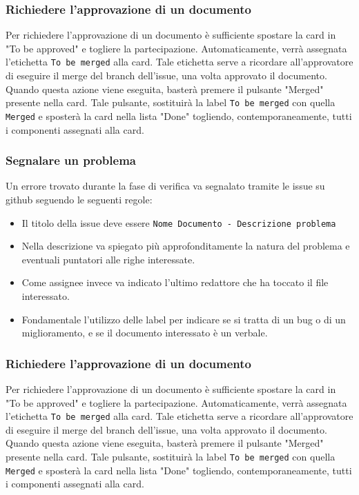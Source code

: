 \subsubsection{Richiedere l'approvazione di un documento}
Per richiedere l'approvazione di un documento è sufficiente spostare la card in "To be approved" e togliere la partecipazione. Automaticamente, verrà assegnata l'etichetta \texttt{To be merged} alla card. Tale etichetta serve a ricordare all'approvatore di eseguire il merge del branch dell'issue, una volta approvato il documento.
Quando questa azione viene eseguita, basterà premere il pulsante "Merged" presente nella card. Tale pulsante, sostituirà la label \texttt{To be merged} con quella \texttt{Merged} e sposterà la card nella lista "Done" togliendo, contemporaneamente, tutti i componenti assegnati alla card.


\subsubsection{Segnalare un problema}
Un errore trovato durante la fase di verifica va segnalato tramite le issue su github
seguendo le seguenti regole:
\begin{itemize}
    \item Il titolo della issue deve essere
    \texttt{Nome Documento - Descrizione problema}
    \item Nella descrizione va spiegato più approfonditamente la natura del
    problema e eventuali puntatori alle righe interessate.
    \item  Come assignee invece va indicato l'ultimo redattore che ha toccato il file
    interessato.
    \item Fondamentale l'utilizzo delle label per indicare se si tratta
    di un bug o di un miglioramento, e se il documento interessato è un verbale.
\end{itemize}

\subsubsection{Richiedere l'approvazione di un documento}
Per richiedere l'approvazione di un documento è sufficiente spostare la card in "To be approved" e togliere la partecipazione. Automaticamente, verrà assegnata l'etichetta \texttt{To be merged} alla card. Tale etichetta serve a ricordare all'approvatore di eseguire il merge del branch dell'issue, una volta approvato il documento.
Quando questa azione viene eseguita, basterà premere il pulsante "Merged" presente nella card. Tale pulsante, sostituirà la label \texttt{To be merged} con quella \texttt{Merged} e sposterà la card nella lista "Done" togliendo, contemporaneamente, tutti i componenti assegnati alla card.

